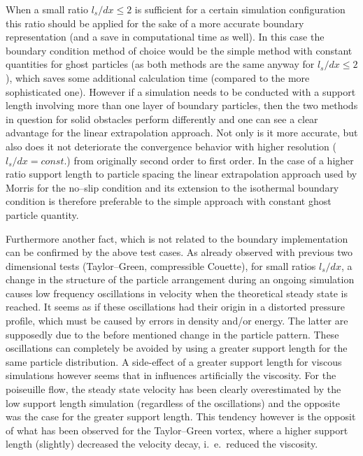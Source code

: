 \documentclass[11pt,a4paper,twoside]{report}
\begin{document}
When a small ratio $l_s/dx\leq2$ is sufficient for a certain simulation configuration this ratio should be applied for the sake of a more accurate boundary representation (and a save in computational time as well). In this case the boundary condition method of choice would be the simple method with constant quantities for ghost particles (as both methods are the same anyway for $l_s/dx\leq2$), which saves some additional calculation time (compared to the more sophisticated one).
However if a simulation needs to be conducted with a support length involving more than one layer of boundary particles, then the two methods in question for solid obstacles  perform differently and one can see a clear advantage for the linear extrapolation approach. Not only is it more accurate, but also does it not deteriorate the convergence behavior with higher resolution ($l_s/dx=const.$) from originally second order to first order.
In the case of a higher ratio support length to particle spacing the linear extrapolation approach used by Morris \cite{Morris1997, Zhu1999} for the no--slip condition and its extension to the isothermal boundary condition is therefore preferable to the simple approach with constant ghost particle quantity.

Furthermore another fact, which is not related to the boundary implementation can be confirmed by the above test cases. As already observed with previous two dimensional tests (Taylor--Green, compressible Couette), for small ratios $l_s/dx$, a change in the structure of the particle arrangement during an ongoing simulation causes low frequency oscillations in velocity when the theoretical steady state is reached. It seems as if these oscillations had their origin in a distorted pressure profile, which must be caused by errors in density and/or energy. The latter are supposedly due to the before mentioned change in the particle pattern. 
These oscillations can completely be avoided by using a greater support length for the same particle distribution. A side-effect of a greater support length for viscous simulations however seems that in influences artificially the viscosity. For the poiseuille flow, the steady state velocity has been clearly overestimated by the low support length simulation (regardless of the oscillations) and the opposite was the case for the greater support length. This tendency however is the opposit of what has been observed for the Taylor--Green vortex, where a higher support length (slightly) decreased the velocity decay, i.\ e.\ reduced the viscosity.
\end{document}

